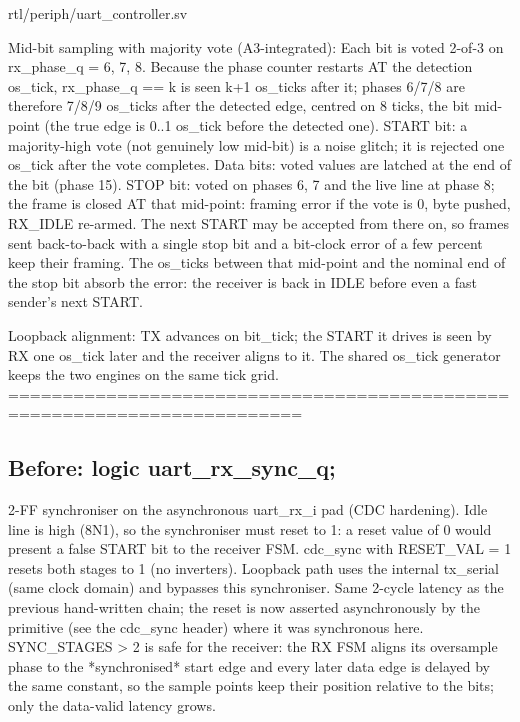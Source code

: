 \begin{relocated}{rtl/periph/uart_controller.sv}
\begin{textblock}
Mid-bit sampling with majority vote (A3-integrated):
  Each bit is voted 2-of-3 on rx_phase_q = 6, 7, 8.  Because the phase
  counter restarts AT the detection os_tick, rx_phase_q == k is seen k+1
  os_ticks after it; phases 6/7/8 are therefore 7/8/9 os_ticks after the
  detected edge, centred on 8 ticks, the bit mid-point (the true edge is
  0..1 os_tick before the detected one).
  START bit: a majority-high vote (not genuinely low mid-bit) is a noise
             glitch; it is rejected one os_tick after the vote completes.
  Data bits: voted values are latched at the end of the bit (phase 15).
  STOP bit:  voted on phases 6, 7 and the live line at phase 8; the frame
             is closed AT that mid-point: framing error if the vote is 0,
             byte pushed, RX_IDLE re-armed.  The next START may be
             accepted from there on, so frames sent back-to-back with a
             single stop bit and a bit-clock error of a few percent keep
             their framing.  The os_ticks between that mid-point and the
             nominal end of the stop bit absorb the error: the receiver
             is back in IDLE before even a fast sender's next START.

Loopback alignment:
  TX advances on bit_tick; the START it drives is seen by RX one os_tick
  later and the receiver aligns to it.  The shared os_tick generator keeps
  the two engines on the same tick grid.
=========================================================================
\end{textblock}

\subsection*{Before: logic uart\_rx\_sync\_q;}

\begin{textblock}
2-FF synchroniser on the asynchronous uart_rx_i pad (CDC hardening).
Idle line is high (8N1), so the synchroniser must reset to 1: a reset
value of 0 would present a false START bit to the receiver FSM.
cdc_sync with RESET_VAL = 1 resets both stages to 1 (no inverters).
Loopback path uses the internal tx_serial (same clock domain) and
bypasses this synchroniser. Same 2-cycle latency as the previous
hand-written chain; the reset is now asserted asynchronously by the
primitive (see the cdc_sync header) where it was synchronous here.
SYNC_STAGES > 2 is safe for the receiver: the RX FSM aligns its
oversample phase to the *synchronised* start edge and every later data
edge is delayed by the same constant, so the sample points keep their
position relative to the bits; only the data-valid latency grows.
\end{textblock}

\end{relocated}

